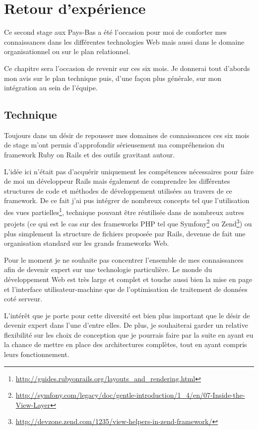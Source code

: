 \documentclass[12pt,a4paper]{book}
\begin{document}
\chapter{Retour d'expérience}

Ce second stage aux Pays-Bas a été l'occasion pour moi de conforter mes connaissances dans les différentes technologies Web mais aussi dans le domaine organisationnel ou sur le plan relationnel.

Ce chapitre sera l'occasion de revenir sur ces six mois. Je donnerai tout d'abords mon avis sur le plan technique puis, d'une façon plus générale, sur mon intégration au sein de l'équipe.

\section{Technique}

Toujours dans un désir de repousser mes domaines de connaissances ces six mois de stage m'ont permis d'approfondir sérieusement ma compréhension du framework Ruby on Rails et des outils gravitant autour.

L'idée ici n'était pas d'acquérir uniquement les compétences nécessaires pour faire de moi un développeur Rails mais également de comprendre les différentes structures de code et méthodes de développement utilisées au travers de ce framework. De ce fait j'ai pus intégrer de nombreux concepts tel que l'utilisation des vues partielles\footnote{\url{http://guides.rubyonrails.org/layouts_and_rendering.html}}, technique pouvant être réutilisée dans de nombreux autres projets (ce qui est le cas sur des frameworks PHP tel que Symfony\footnote{\url{http://symfony.com/legacy/doc/gentle-introduction/1_4/en/07-Inside-the-View-Layer}} ou Zend\footnote{\url{http://devzone.zend.com/1235/view-helpers-in-zend-framework/}}) ou plus simplement la structure de fichiers proposée par Rails, devenue de fait une organisation standard sur les grands frameworks Web.

Pour le moment je ne souhaite pas concentrer l'ensemble de mes connaissances afin de devenir expert sur une technologie particulière. Le monde du développement Web est très large et complet et touche aussi bien la mise en page et l'interface utilisateur-machine que de l'optimisation de traitement de données coté serveur.

L'intérêt que je porte pour cette diversité est bien plus important que le désir de devenir expert dans l'une d'entre elles. De plus, je souhaiterai garder un relative flexibilité sur les choix de conception que je pourrais faire par la suite en ayant eu la chance de mettre en place des architectures complètes, tout en ayant compris leurs fonctionnement.
\end{document}
